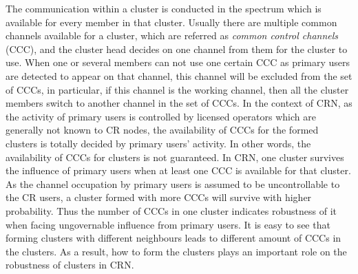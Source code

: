 \documentclass[journal,comsoc]{IEEEtran}
\theoremstyle{mytheoremstyle}
\theoremstyle{mytheoremstyle}
\theoremstyle{mytheoremstyle}
\newcommand{\ie}{i.e., }
\begin{document}

The communication within a cluster is conducted in the spectrum which is available for every member in that cluster.
Usually there are multiple common channels available for a cluster, which are referred as \textit{common control channels} (CCC), and the cluster head decides on one channel from them for the cluster to use.
When one or several members can not use one certain CCC as primary users are detected to appear on that channel, this channel will be excluded from the set of CCCs, in particular, if this channel is the working channel, then all the cluster members switch to another channel in the set of CCCs.
In the context of CRN, as the activity of primary users is controlled by licensed operators which are generally not known to CR nodes, the availability of CCCs for the formed clusters  is totally decided by primary users' activity.
In other words, the availability of CCCs for clusters is not guaranteed. 
%
In CRN, one cluster survives the influence of primary users when at least one CCC is available for that cluster.
As the channel occupation by primary users is assumed to be uncontrollable to the CR users, a cluster formed with more CCCs will survive with higher probability.
Thus the number of CCCs in one cluster indicates robustness of it when facing ungovernable influence from primary users.
It is easy to see that forming clusters with different neighbours leads to different amount of CCCs in the clusters.
As a result, how to form the clusters plays an important role on the robustness of clusters in CRN.

\end{document}
